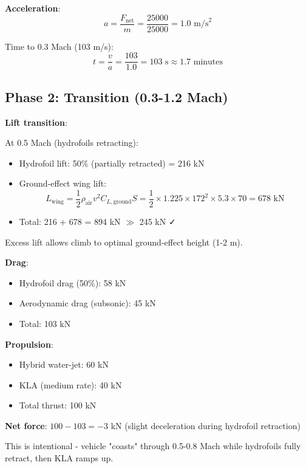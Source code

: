 \documentclass[12pt,a4paper]{article}
\begin{document}
\textbf{Acceleration}:
\begin{equation}
a = \frac{F_{\text{net}}}{m} = \frac{25000}{25000} = 1.0 \text{ m/s}^2
\end{equation}

Time to 0.3 Mach (103 m/s):
\begin{equation}
t = \frac{v}{a} = \frac{103}{1.0} = 103 \text{ s} \approx 1.7 \text{ minutes}
\end{equation}

\subsection{Phase 2: Transition (0.3-1.2 Mach)}

\textbf{Lift transition}:

At 0.5 Mach (hydrofoils retracting):
\begin{itemize}
\item Hydrofoil lift: 50\% (partially retracted) = 216 kN
\item Ground-effect wing lift: 
\begin{equation}
L_{\text{wing}} = \frac{1}{2} \rho_{\text{air}} v^2 C_{L,\text{ground}} S = \frac{1}{2} \times 1.225 \times 172^2 \times 5.3 \times 70 = 678 \text{ kN}
\end{equation}
\item Total: 216 + 678 = 894 kN $\gg$ 245 kN ✓
\end{itemize}

Excess lift allows climb to optimal ground-effect height (1-2 m).

\textbf{Drag}:
\begin{itemize}
\item Hydrofoil drag (50\%): 58 kN
\item Aerodynamic drag (subsonic): 45 kN
\item Total: 103 kN
\end{itemize}

\textbf{Propulsion}:
\begin{itemize}
\item Hybrid water-jet: 60 kN
\item KLA (medium rate): 40 kN
\item Total thrust: 100 kN
\end{itemize}

\textbf{Net force}: $100 - 103 = -3$ kN (slight deceleration during hydrofoil retraction)

This is intentional - vehicle "coasts" through 0.5-0.8 Mach while hydrofoils fully retract, then KLA ramps up.
\end{document}
